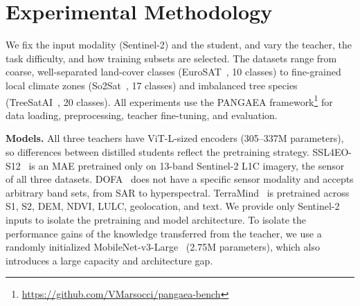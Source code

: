 \documentclass[conference]{IEEEtran}
\begin{document}

\section{Experimental Methodology}
We fix the input modality (Sentinel-2) and the student, and vary the teacher, the task difficulty, and how training subsets are selected.
The datasets range from coarse, well-separated land-cover classes (EuroSAT~\cite{helber2019eurosat}, 10 classes) to fine-grained local climate zones (So2Sat~\cite{Zhu2020So2Sat}, 17 classes) and imbalanced tree species (TreeSatAI~\cite{Ahlswede2023}, 20 classes).
All experiments use the PANGAEA framework\footnote{\url{https://github.com/VMarsocci/pangaea-bench}} for data loading, preprocessing, teacher fine-tuning, and evaluation.


\textbf{Models.} All three teachers have ViT-L-sized encoders (305--337M parameters), so differences between distilled students reflect the pretraining strategy.
SSL4EO-S12~\cite{wang2023ssl4eo} is an MAE pretrained only on 13-band Sentinel-2 L1C imagery, the sensor of all three datasets.
DOFA~\cite{xiong2024neural} does not have a specific sensor modality and accepts arbitrary band sets, from SAR to hyperspectral.
TerraMind~\cite{jakubik2025terramind} is pretrained across S1, S2, DEM, NDVI, LULC, geolocation, and text.
We provide only Sentinel-2 inputs to isolate the pretraining and model architecture.
To isolate the performance gains of the knowledge transferred from the teacher, we use a randomly initialized MobileNet-v3-Large~\cite{9008835} (2.75M parameters), which also introduces a large capacity and architecture gap.
\end{document}
